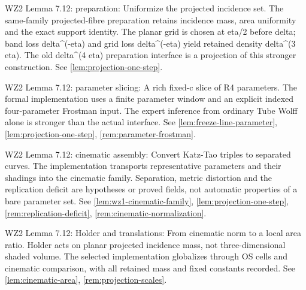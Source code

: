 \begin{remark}
\label{rem:atlas-W2ImageUniform}
WZ2 Lemma 7.12: preparation: Uniformize the projected incidence set.
The same-family projected-fibre preparation retains incidence mass, area uniformity and the exact support identity. The planar grid is chosen at eta/2 before delta; band loss delta\textasciicircum{}(-eta) and grid loss delta\textasciicircum{}(-eta) yield retained density delta\textasciicircum{}(3 eta). The old delta\textasciicircum{}(4 eta) preparation interface is a projection of this stronger construction.
See \ref{lem:projection-one-step}.
\end{remark}

\begin{remark}
\label{rem:atlas-W2Slice}
WZ2 Lemma 7.12: parameter slicing: A rich fixed-c slice of R4 parameters.
The formal implementation uses a finite parameter window and an explicit indexed four-parameter Frostman input. The expert inference from ordinary Tube Wolff alone is stronger than the actual interface.
See \ref{lem:freeze-line-parameter}, \ref{lem:projection-one-step}, \ref{rem:parameter-frostman}.
\end{remark}

\begin{remark}
\label{rem:atlas-W2JetCount}
WZ2 Lemma 7.12: cinematic assembly: Convert Katz-Tao triples to separated curves.
The implementation transports representative parameters and their shadings into the cinematic family. Separation, metric distortion and the replication deficit are hypotheses or proved fields, not automatic properties of a bare parameter set.
See \ref{lem:wz1-cinematic-family}, \ref{lem:projection-one-step}, \ref{rem:replication-deficit}, \ref{rem:cinematic-normalization}.
\end{remark}

\begin{remark}
\label{rem:atlas-W2AreaCompare}
WZ2 Lemma 7.12: Holder and translations: From cinematic norm to a local area ratio.
Holder acts on planar projected incidence mass, not three-dimensional shaded volume. The selected implementation globalizes through OS cells and cinematic comparison, with all retained mass and fixed constants recorded.
See \ref{lem:cinematic-area}, \ref{rem:projection-scales}.
\end{remark}

